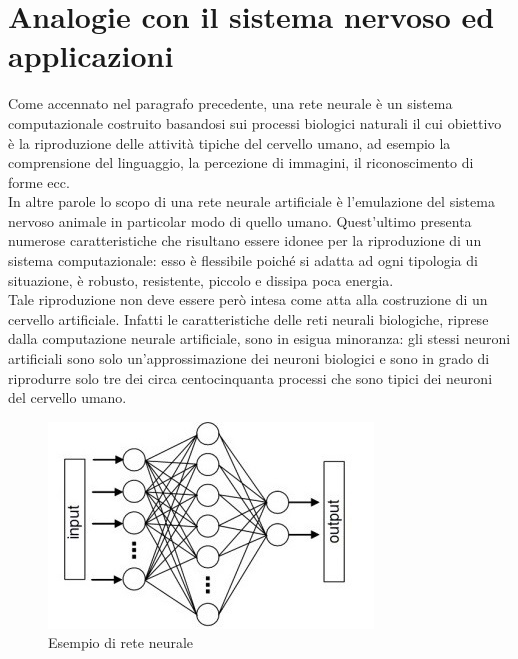 \documentclass[12pt,a4paper,oneside]{book}
\begin{document}
	\clearpage	
	\section{Analogie con il sistema nervoso ed applicazioni}
	
		Come accennato nel paragrafo precedente, una rete neurale è un sistema computazionale costruito basandosi sui processi biologici naturali il cui obiettivo è la riproduzione delle attività tipiche del cervello umano, ad esempio la comprensione del linguaggio, la percezione di immagini, il riconoscimento di forme ecc.  \\
		In altre parole lo scopo di una rete neurale artificiale è l’emulazione del sistema nervoso animale in particolar modo di quello umano. Quest'ultimo presenta numerose caratteristiche che risultano essere idonee per la riproduzione di un sistema computazionale: esso è flessibile poiché si adatta ad ogni tipologia di situazione, è robusto, resistente, piccolo e dissipa poca energia. \\
		Tale riproduzione non deve essere però intesa come atta alla costruzione di un cervello artificiale. Infatti le caratteristiche delle reti neurali biologiche, riprese dalla computazione neurale artificiale, sono in esigua minoranza: gli stessi neuroni artificiali sono solo un’approssimazione dei neuroni biologici e sono in grado di riprodurre solo tre dei circa centocinquanta processi che sono tipici dei neuroni del cervello umano.\\
		
		\begin{figure}[h]
			\centering
			\includegraphics[width=0.6\linewidth]{IMMAGINI/esempioiniziale}
			\caption{Esempio di rete neurale}
			\label{fig:esempio}
		\end{figure}
		
\end{document}
